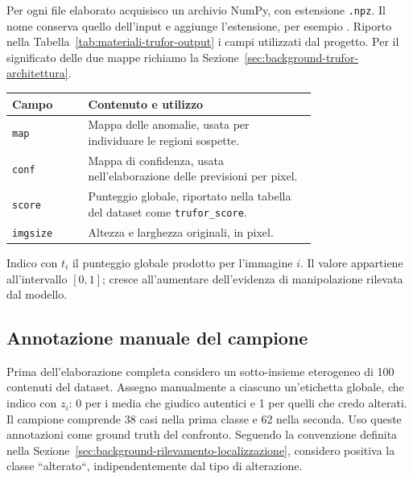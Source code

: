 Per ogni file elaborato acquisisco un archivio NumPy, con estensione \texttt{.npz}. Il nome conserva quello dell'input e aggiunge l'estensione, per esempio . Riporto nella Tabella~\ref{tab:materiali-trufor-output} i campi utilizzati dal progetto. Per il significato delle due mappe richiamo la Sezione~\ref{sec:background-trufor-architettura}.

\bigskip\noindent
\begin{minipage}{\linewidth}
    \centering
    \small
    \makeatletter{}\makeatother
    \caption{Campi degli output di TruFor utilizzati nella pipeline~\cite{Guillaro_2023_CVPR}.}
    \label{tab:materiali-trufor-output}
    \begin{tabular}{@{}lp{0.75\linewidth}@{}}
        \toprule
        Campo & Contenuto e utilizzo \\
        \midrule
        \texttt{map} & Mappa delle anomalie, usata per individuare le regioni sospette. \\
        \addlinespace
        \texttt{conf} & Mappa di confidenza, usata nell'elaborazione delle previsioni per pixel. \\
        \addlinespace
        \texttt{score} & Punteggio globale, riportato nella tabella del dataset come \texttt{trufor\_score}. \\
        \addlinespace
        \texttt{imgsize} & Altezza e larghezza originali, in pixel. \\
        \bottomrule
    \end{tabular}
\end{minipage}
\bigskip

Indico con $t_i$ il punteggio globale prodotto per l'immagine $i$. Il valore appartiene all'intervallo $[0,1]$; cresce all'aumentare dell'evidenza di manipolazione rilevata dal modello.

\subsection{Annotazione manuale del campione}
\label{sec:materiali-trufor-annotazioni}

Prima dell'elaborazione completa considero un sotto-insieme eterogeneo di 100 contenuti del dataset. Assegno manualmente a ciascuno un'etichetta globale, che indico con $z_i$: 0 per i media che giudico autentici e 1 per quelli che credo alterati. Il campione comprende 38 casi nella prima classe e 62 nella seconda. Uso queste annotazioni come ground truth del confronto. Seguendo la convenzione definita nella Sezione~\ref{sec:background-rilevamento-localizzazione}, considero positiva la classe ``alterato``, indipendentemente dal tipo di alterazione.


